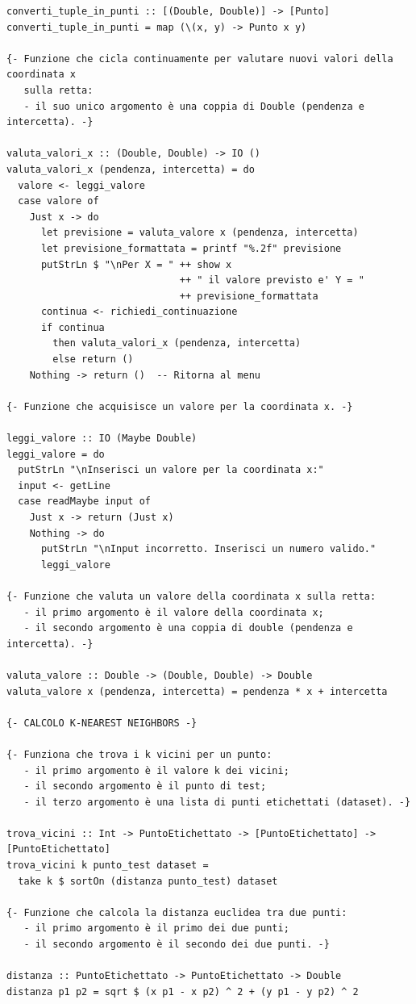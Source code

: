 \documentclass[11pt]{article}
\theoremstyle{definition}
\begin{document}
\begin{verbatim}
converti_tuple_in_punti :: [(Double, Double)] -> [Punto]
converti_tuple_in_punti = map (\(x, y) -> Punto x y)

{- Funzione che cicla continuamente per valutare nuovi valori della coordinata x 
   sulla retta:
   - il suo unico argomento è una coppia di Double (pendenza e intercetta). -}

valuta_valori_x :: (Double, Double) -> IO ()
valuta_valori_x (pendenza, intercetta) = do
  valore <- leggi_valore
  case valore of
    Just x -> do
      let previsione = valuta_valore x (pendenza, intercetta)
      let previsione_formattata = printf "%.2f" previsione
      putStrLn $ "\nPer X = " ++ show x 
                              ++ " il valore previsto e' Y = " 
                              ++ previsione_formattata
      continua <- richiedi_continuazione
      if continua
        then valuta_valori_x (pendenza, intercetta)
        else return ()
    Nothing -> return ()  -- Ritorna al menu

{- Funzione che acquisisce un valore per la coordinata x. -}

leggi_valore :: IO (Maybe Double)
leggi_valore = do
  putStrLn "\nInserisci un valore per la coordinata x:"
  input <- getLine
  case readMaybe input of
    Just x -> return (Just x)
    Nothing -> do
      putStrLn "\nInput incorretto. Inserisci un numero valido."
      leggi_valore

{- Funzione che valuta un valore della coordinata x sulla retta:
   - il primo argomento è il valore della coordinata x;
   - il secondo argomento è una coppia di double (pendenza e intercetta). -}

valuta_valore :: Double -> (Double, Double) -> Double
valuta_valore x (pendenza, intercetta) = pendenza * x + intercetta

{- CALCOLO K-NEAREST NEIGHBORS -}

{- Funziona che trova i k vicini per un punto:
   - il primo argomento è il valore k dei vicini;
   - il secondo argomento è il punto di test;
   - il terzo argomento è una lista di punti etichettati (dataset). -}

trova_vicini :: Int -> PuntoEtichettato -> [PuntoEtichettato] -> [PuntoEtichettato]
trova_vicini k punto_test dataset =
  take k $ sortOn (distanza punto_test) dataset

{- Funzione che calcola la distanza euclidea tra due punti:
   - il primo argomento è il primo dei due punti;
   - il secondo argomento è il secondo dei due punti. -}

distanza :: PuntoEtichettato -> PuntoEtichettato -> Double
distanza p1 p2 = sqrt $ (x p1 - x p2) ^ 2 + (y p1 - y p2) ^ 2


\end{verbatim}
\end{document}
